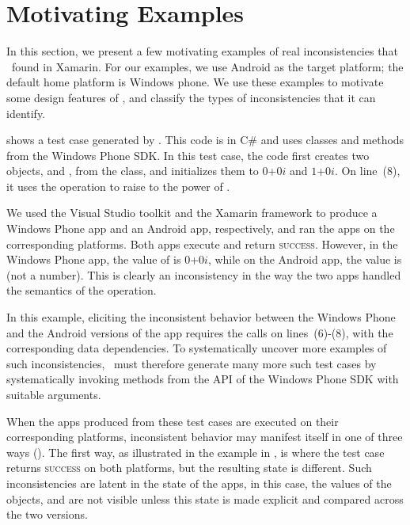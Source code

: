 \section{Motivating Examples}
\label{section:example}

In this section, we present a few motivating examples of real inconsistencies
that \tool\ found in Xamarin. For our examples, we use Android as the target
platform; the default home platform is Windows phone.  We use these examples to
motivate some design features of \tool, and classify the types of
inconsistencies that it can identify. 

 shows a test case generated by \tool. This code
is in C\# and uses classes and methods from the Windows Phone SDK. In this test
case, the code first creates two objects,  and , from the
 class, and initializes them to $0$+$0i$ and
$1$+$0i$. On line~(8), it uses the  operation to raise
 to the power of .

We used the Visual Studio toolkit and the Xamarin framework to produce a
Windows Phone app and an Android app, respectively, and ran the apps on the
corresponding platforms. Both apps execute and return \textsc{success}.
However, in the Windows Phone app, the value of  is $0$+$0i$, while
on the Android app, the value is  (not a number). This is clearly an
inconsistency in the way the two apps handled the semantics of the
 operation.

In this example, eliciting the inconsistent behavior between the Windows Phone
and the Android versions of the app requires the calls on lines~(6)-(8), with
the corresponding data dependencies. To systematically uncover more examples of
such inconsistencies, \tool\ must therefore generate many more such test cases
by systematically invoking methods from the API of the Windows Phone SDK with
suitable arguments.

When the apps produced from these test cases are executed on their
corresponding platforms, inconsistent behavior may manifest itself in one of
three ways (). The first way, as
illustrated in the example in , is where the test
case returns \textsc{success} on both platforms, but the resulting state is
different.  Such inconsistencies are latent in the state of the apps, in this
case, the values of the objects, and are not visible unless this state is made
explicit and compared across the two versions. 

